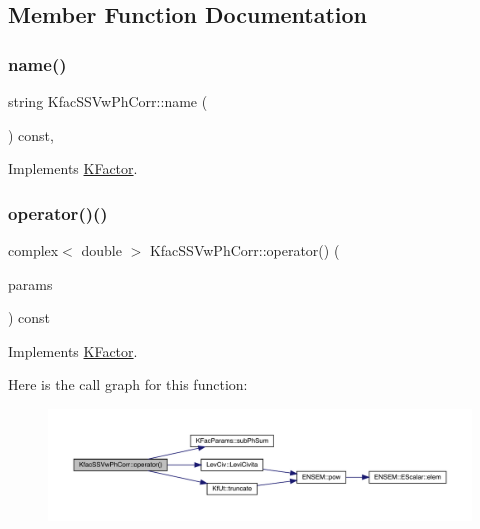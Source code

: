 \subsection{Member Function Documentation}
\mbox{\label{classKfacSSVwPhCorr_a8f314b4585a7d3a9b17795cad0682309}} 
\subsubsection{\texorpdfstring{name()}{name()}}
{\footnotesize\ttfamily string Kfac\+S\+S\+Vw\+Ph\+Corr\+::name (\begin{DoxyParamCaption}{ }\end{DoxyParamCaption}) const\hspace{0.3cm}{\ttfamily [inline]}, {\ttfamily [virtual]}}



Implements \mbox{\hyperlink{classKFactor_ae578f8d6e4b525895427717da99cab6c}{K\+Factor}}.

\mbox{\label{classKfacSSVwPhCorr_abe3adeddc111ac5016b07086242fd7f1}} 
\subsubsection{\texorpdfstring{operator()()}{operator()()}}
{\footnotesize\ttfamily complex$<$ double $>$ Kfac\+S\+S\+Vw\+Ph\+Corr\+::operator() (\begin{DoxyParamCaption}\item[{const \mbox{\hyperlink{classKFacParams}{K\+Fac\+Params}} \&}]{params }\end{DoxyParamCaption}) const\hspace{0.3cm}{\ttfamily [virtual]}}



Implements \mbox{\hyperlink{classKFactor_a4273897de4ef590083c7ef208b8d0f18}{K\+Factor}}.

Here is the call graph for this function\+:
\nopagebreak
\begin{figure}[H]
\begin{center}
\leavevmode
\includegraphics[width=350pt]{df/df0/classKfacSSVwPhCorr_abe3adeddc111ac5016b07086242fd7f1_cgraph}
\end{center}
\end{figure}


